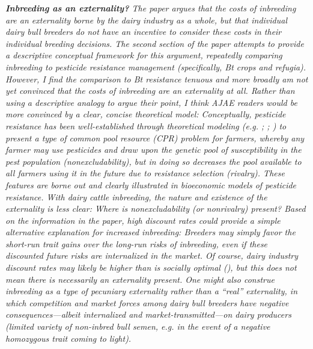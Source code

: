 \documentclass[12pt,letterpaper]{article}
\begin{document}
{\it
\textbf{Inbreeding as an externality?} The paper argues that the costs of inbreeding are an externality borne by the dairy industry as a whole, but that individual dairy bull breeders do not have an incentive to consider these costs in their individual breeding decisions. The second section of the paper attempts to provide a descriptive conceptual framework for this argument, repeatedly comparing
inbreeding to pesticide resistance management (specifically, Bt crops and refugia).
However, I find the comparison to Bt resistance tenuous and more broadly am not
yet convinced that the costs of inbreeding are an externality at all. Rather than using a descriptive analogy to argue their point, I think AJAE readers would be more convinced by a clear, concise theoretical model: Conceptually, pesticide resistance has been well-established through theoretical modeling  (e.g. \cite{Hueth1974}; \cite{Miranowski1986}; \cite{Cho2024}) to present a type of common pool resource (CPR) problem for farmers, whereby any farmer may use pesticides and draw upon the genetic pool of susceptibility in the pest population (nonexcludability), but in doing so decreases the pool available to all farmers using it in the future due to resistance selection (rivalry). These features are borne out and clearly illustrated in bioeconomic models of pesticide resistance. With dairy cattle inbreeding, the nature and existence of the externality is less clear: Where is nonexcludability (or nonrivalry) present? Based on the information in the paper, high discount rates could provide a simple alternative explanation for increased inbreeding: Breeders may simply favor the short-run trait gains over the long-run risks of inbreeding, even if these discounted future risks are internalized in the market. Of course, dairy industry discount rates may likely be higher than is socially optimal (\cite{Wuepper2023}), but this does not mean there is necessarily an externality present. One might also construe inbreeding as a type of pecuniary externality rather than a ``real'' externality, in which competition and market forces among dairy bull breeders have negative consequences—albeit internalized and market-transmitted—on dairy producers (limited variety of non-inbred bull semen, e.g. in the event of a negative homozygous trait coming to light).\\

}
\end{document}
